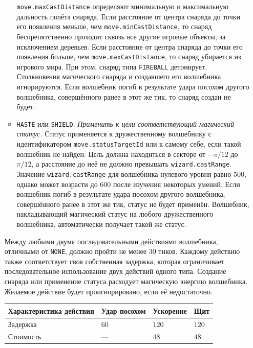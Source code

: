 \begin{itemize}
\begin{itemize}
                    \texttt{move.maxCastDistance} определяют минимальную и максимальную дальность полёта снаряда. Если расстояние от центра
                    снаряда до точки его появления меньше, чем \texttt{move.minCastDistance}, то снаряд беспрепятственно проходит сквозь все
                    другие игровые объекты, за исключением деревьев. Если расстояние от центра снаряда до точки его появления больше, чем
                    \texttt{move.maxCastDistance}, то снаряд убирается из игрового мира. При этом, снаряд типа \texttt{FIREBALL} детонирует.
                    Столкновения магического снаряда и создавшего его волшебника игнорируются. Если волшебник погиб в результате удара
                    посохом другого волшебника, совершённого ранее в этот же тик, то снаряд создан не будет.
              \item \texttt{HASTE} или \texttt{SHIELD}. \textit{Применить к цели соответствующий магический статус.} Статус применяется к
                    дружественному волшебнику с идентификатором \texttt{move.statusTargetId} или к самому себе, если такой волшебник не
                    найден. Цель должна находиться в секторе от $-\pi / 12$ до $\pi / 12$, а расстояние до неё не должно превышать
                    \texttt{wizard.castRange}. Значение \texttt{wizard.castRange} для волшебника нулевого уровня равно $500$, однако может
                    возрасти до $600$ после изучения некоторых умений. Если волшебник погиб в результате удара посохом другого волшебника,
                    совершённого ранее в этот же тик, статус не будет применён. Волшебник, накладывающий магический статус на любого
                    дружественного волшебника, автоматически получает такой же статус.
          \end{itemize}

          Между любыми двумя последовательными действиями волшебника, отличными от \texttt{NONE}, должно пройти не менее $30$ тиков. Каждому
          действию также соответствует своя собственная задержка, которая ограничивает последовательное использование двух действий одного
          типа. Создание снаряда или применение статуса расходует магическую энергию волшебника. Желаемое действие будет проигнорировано,
          если её недостаточно.

          \begin{tabular}{| l | l | l | l |}
              \hline
              Характеристика действия & Удар посохом & Ускорение & Щит   \\
              \hline
              Задержка                & $60$         & $120$     & $120$ \\
              Стоимость               & ---          & $48$      & $48$  \\
              \hline
          \end{tabular}


\end{itemize}
